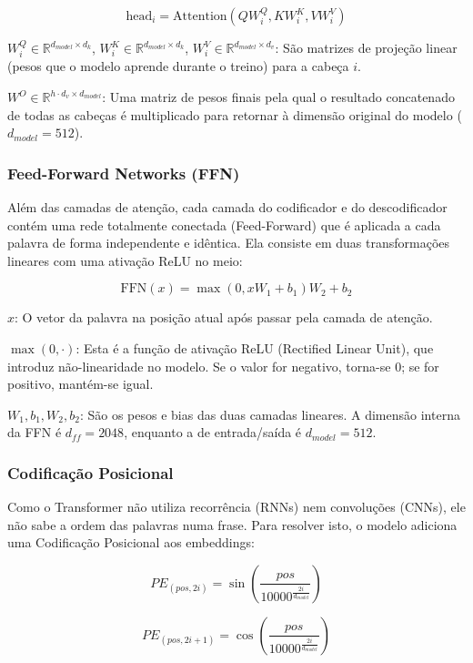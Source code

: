 \documentclass[12pt]{article}
\begin{document}
    $$\text{head}_i = \text{Attention}(QW_i^Q, KW_i^K, VW_i^V)$$
    
    $W_i^Q \in \mathbb{R}^{d_{model} \times d_k}$, $W_i^K \in \mathbb{R}^{d_{model} \times d_k}$, $W_i^V \in \mathbb{R}^{d_{model} \times d_v}$: São matrizes de projeção linear (pesos que o modelo aprende durante o treino) para a cabeça $i$.
    
    $W^O \in \mathbb{R}^{h \cdot d_v \times d_{model}}$: Uma matriz de pesos finais pela qual o resultado concatenado de todas as cabeças é multiplicado para retornar à dimensão original do modelo ($d_{model} = 512$).
   
    \subsubsection{Feed-Forward Networks (FFN)}
    
    Além das camadas de atenção, cada camada do codificador e do descodificador contém uma rede totalmente conectada (Feed-Forward) que é aplicada a cada palavra de forma independente e idêntica. Ela consiste em duas transformações lineares com uma ativação ReLU no meio:
    
    $$\text{FFN}(x) = \max(0, xW_1 + b_1)W_2 + b_2$$
   
    $x$: O vetor da palavra na posição atual após passar pela camada de atenção.
    
    $\max(0, \cdot)$: Esta é a função de ativação ReLU (Rectified Linear Unit), que introduz não-linearidade no modelo. Se o valor for negativo, torna-se 0; se for positivo, mantém-se igual.
    
    $W_1, b_1, W_2, b_2$: São os pesos e bias das duas camadas lineares. A dimensão interna da FFN é $d_{ff} = 2048$, enquanto a de entrada/saída é $d_{model} = 512$.
  
    \subsubsection{Codificação Posicional}
    
    Como o Transformer não utiliza recorrência (RNNs) nem convoluções (CNNs), ele não sabe a ordem das palavras numa frase. Para resolver isto, o modelo adiciona uma Codificação Posicional aos embeddings:
    
    $$PE_{(pos, 2i)} = \sin\left(\frac{pos}{10000^{\frac{2i}{d_{model}}}}\right)$$
    
    $$PE_{(pos, 2i+1)} = \cos\left(\frac{pos}{10000^{\frac{2i}{d_{model}}}}\right)$$
  
\end{document}
